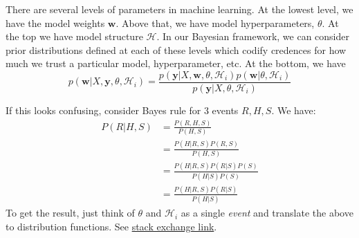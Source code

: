 There are several levels of parameters in machine learning. At the lowest level, we have the model weights $\mathbf{w}$. Above that, we have model hyperparameters, $\theta$. At the top we have model structure $\mathcal{H}$. In our Bayesian framework, we can consider prior distributions defined at each of these levels which codify credences for how much we trust a particular model, hyperparameter, etc. At the bottom, we have
\begin{equation}
  p(\mathbf{w} \vert X, \mathbf{y}, \theta, \mathcal{H}_i) = \frac{p(\mathbf{y} \vert X, \mathbf{w}, \theta, \mathcal{H}_i) p(\mathbf{w}\vert \theta, \mathcal{H}_i) }{p(\mathbf{y}\vert X, \theta, \mathcal{H}_i)}
\end{equation}

If this looks confusing, consider Bayes rule for 3 events $R, H, S$. We have:
\begin{align}
  P(R \vert H, S) &= \frac{P(R,H,S)}{P(H,S)} \\
  &= \frac{P(H \vert R, S)P(R, S)}{P(H,S)}\\
  &= \frac{P(H \vert R, S)P(R\vert S)P(S)}{P(H\vert S)P(S)} \\
  &= \frac{P(H \vert R, S)P(R\vert S)}{P(H\vert S)}
\end{align}
To get the result, just think of $\theta$ and $\mathcal{H}_i$ as a single \textit{event} and translate the above to distribution functions. See \href{https://math.stackexchange.com/questions/1281454/bayes-rule-with-3-variables}{stack exchange link}.

